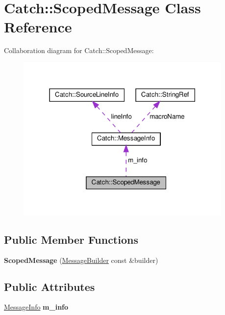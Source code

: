 \hypertarget{classCatch_1_1ScopedMessage}{}\section{Catch\+::Scoped\+Message Class Reference}
\label{classCatch_1_1ScopedMessage}


Collaboration diagram for Catch\+::Scoped\+Message\+:
\nopagebreak
\begin{figure}[H]
\begin{center}
\leavevmode
\includegraphics[width=302pt]{classCatch_1_1ScopedMessage__coll__graph}
\end{center}
\end{figure}
\subsection*{Public Member Functions}
\begin{DoxyCompactItemize}
\item 
\mbox{\label{classCatch_1_1ScopedMessage_a5cc59f0f2ebe840e6607f83004d49a17}} 
{\bfseries Scoped\+Message} (\mbox{\hyperlink{structCatch_1_1MessageBuilder}{Message\+Builder}} const \&builder)
\end{DoxyCompactItemize}
\subsection*{Public Attributes}
\begin{DoxyCompactItemize}
\item 
\mbox{\label{classCatch_1_1ScopedMessage_ae6e1476f389cc6e1586f033b3747b27b}} 
\mbox{\hyperlink{structCatch_1_1MessageInfo}{Message\+Info}} {\bfseries m\+\_\+info}
\end{DoxyCompactItemize}



